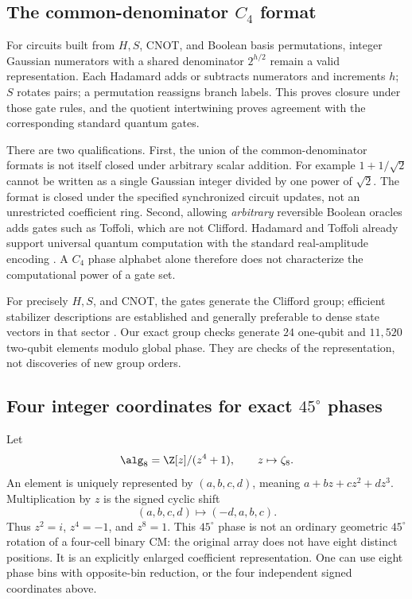 \subsection{The common-denominator \texorpdfstring{$C_4$}{C4} format}
For circuits built from $H,S$, CNOT, and Boolean basis permutations, integer Gaussian numerators with a shared denominator $2^{h/2}$ remain a valid representation. Each Hadamard adds or subtracts numerators and increments $h$; $S$ rotates pairs; a permutation reassigns branch labels. This proves closure under those gate rules, and the quotient intertwining proves agreement with the corresponding standard quantum gates.

There are two qualifications. First, the union of the common-denominator formats is not itself closed under arbitrary scalar addition. For example $1+1/\sqrt2$ cannot be written as a single Gaussian integer divided by one power of $\sqrt2$. The format is closed under the specified synchronized circuit updates, not an unrestricted coefficient ring. Second, allowing \emph{arbitrary} reversible Boolean oracles adds gates such as Toffoli, which are not Clifford. Hadamard and Toffoli already support universal quantum computation with the standard real-amplitude encoding \cite{aharonov}. A $C_4$ phase alphabet alone therefore does not characterize the computational power of a gate set.

For precisely $H,S$, and CNOT, the gates generate the Clifford group; efficient stabilizer descriptions are established and generally preferable to dense state vectors in that sector \cite{aaronson}. Our exact group checks generate $24$ one-qubit and $11{,}520$ two-qubit elements modulo global phase. They are checks of the representation, not discoveries of new group orders.

\subsection{Four integer coordinates for exact \texorpdfstring{$45^\circ$}{45-degree} phases}
Let
\begin{equation}
 \alg_8=\Z[z]/(z^4+1),\qquad z\mapsto\zeta_8.
\end{equation}
An element is uniquely represented by $(a,b,c,d)$, meaning $a+bz+cz^2+dz^3$. Multiplication by $z$ is the signed cyclic shift
\begin{equation}
 (a,b,c,d)\longmapsto(-d,a,b,c).
\end{equation}
Thus $z^2=i$, $z^4=-1$, and $z^8=1$. This $45^\circ$ phase is not an ordinary geometric $45^\circ$ rotation of a four-cell binary CM: the original array does not have eight distinct positions. It is an explicitly enlarged coefficient representation. One can use eight phase bins with opposite-bin reduction, or the four independent signed coordinates above.

